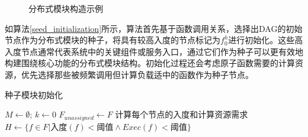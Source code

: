 \begin{figure}[ht]
\centering
{}
\hfill
{}
\caption{分布式模块构造示例}
\label{fig:dismod}
\end{figure}

如算法\ref{seed_initialization}所示，算法首先基于函数调用关系，选择出DAG的初始节点作为分布式模块的种子，将具有较高入度的节点标记为$f_0^h$进行初始化。这些高入度节点通常代表系统中的关键组件或服务入口，通过它们作为种子可以更有效地构建围绕核心功能的分布式模块结构。初始化过程还会考虑原子函数需要的计算资源，优先选择那些被频繁调用但计算负载适中的函数作为种子节点。

\begin{algorithm}[ht]
	\caption{种子模块初始化}
	\label{seed_initialization}
	\SetAlgoLined
	
	$M \gets \emptyset$; $k \gets 0$\;
	$F_{unassigned} \gets F$\;
	计算每个节点的入度和计算资源需求\;
	$H \gets \{f \in F | \text{入度}(f) < \text{阈值} \wedge Exec(f) < \text{阈值}\}$\;
	\;
\end{algorithm}

